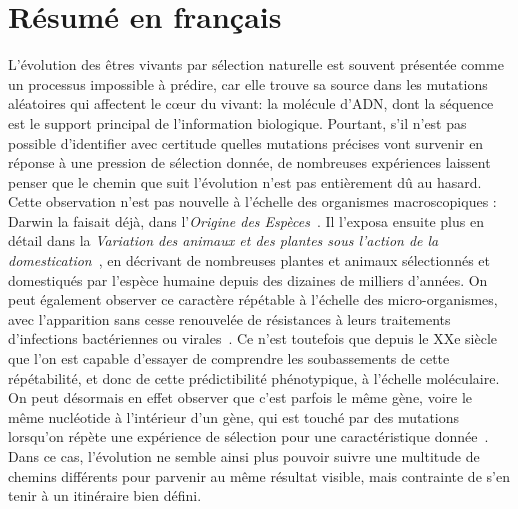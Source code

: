 
\chapter{Résumé en français}

L'évolution des êtres vivants par sélection naturelle est souvent présentée comme un processus impossible à prédire, car elle trouve sa source dans les mutations aléatoires qui affectent le cœur du vivant: la molécule d'ADN, dont la séquence est le support principal de l'information biologique.
Pourtant, s'il n'est pas possible d'identifier avec certitude quelles mutations précises vont survenir en réponse à une pression de sélection donnée, de nombreuses expériences laissent penser que le chemin que suit l'évolution n'est pas entièrement dû au hasard.
Cette observation n'est pas nouvelle à l'échelle des organismes macroscopiques : Darwin la faisait déjà, dans l'\emph{Origine des Espèces}~\citep{darwin1859}.
Il l'exposa ensuite plus en détail dans la \emph{Variation des animaux et des plantes sous l'action de la domestication}~\citep{darwin1868}, en décrivant de nombreuses plantes et animaux sélectionnés et domestiqués par l'espèce humaine depuis des dizaines de milliers d'années.
On peut également observer ce caractère répétable à l'échelle des micro-organismes, avec l'apparition sans cesse renouvelée de résistances à leurs traitements d'infections bactériennes ou virales~\citep{levy2004}.
Ce n'est toutefois que depuis le XXe siècle que l'on est capable d'essayer de comprendre les soubassements de cette répétabilité, et donc de cette prédictibilité phénotypique, à l'échelle moléculaire.
On peut désormais en effet observer que c'est parfois le même gène, voire le même nucléotide à l'intérieur d'un gène, qui est touché par des mutations lorsqu'on répète une expérience de sélection pour une caractéristique donnée~\citep{wortel2021}.
Dans ce cas, l'évolution ne semble ainsi plus pouvoir suivre une multitude de chemins différents pour parvenir au même résultat visible, mais contrainte de s'en tenir à un itinéraire bien défini.

